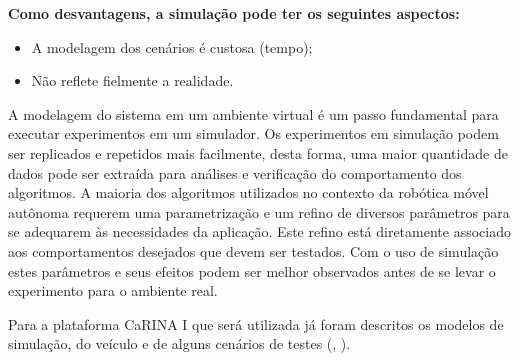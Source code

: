 \textbf{Como desvantagens, a simulação pode ter os seguintes aspectos:}

\begin{itemize}
\item A modelagem dos cenários é custosa (tempo);
\item Não reflete fielmente a realidade.
\end{itemize}


A modelagem do sistema em um ambiente virtual é um passo fundamental para
executar experimentos em um simulador. Os experimentos em simulação podem ser
replicados e repetidos mais facilmente, desta forma, uma maior quantidade de
dados pode ser extraída para análises e verificação do comportamento dos
algoritmos. A maioria dos algoritmos utilizados no contexto da robótica móvel
autônoma requerem uma parametrização e um refino de diversos parâmetros para se
adequarem às necessidades da aplicação. Este refino está diretamente associado
aos comportamentos desejados que devem ser testados. Com o uso de simulação
estes parâmetros e seus efeitos podem ser melhor observados antes de se levar o
experimento para o ambiente real.

Para a plataforma CaRINA I que será utilizada já foram descritos os modelos de
simulação, do veículo e de alguns cenários de testes (,
).

